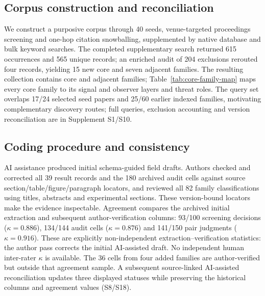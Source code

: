 \subsection{Corpus construction and reconciliation}
We construct a purposive corpus through 40 seeds, venue-targeted proceedings screening and one-hop citation snowballing, supplemented by native database and bulk keyword searches. The completed supplementary search returned 615 occurrences and 565 unique records; an enriched audit of 204 exclusions rerouted four records, yielding 15 new core and seven adjacent families. The resulting collection contains \FinalCore{} core and \FinalAdjacent{} adjacent families; Table~\ref{tab:core-family-map} maps every core family to its signal and observer layers and threat roles. The query set overlaps 17/24 selected seed papers and 25/60 earlier indexed families, motivating complementary discovery routes; full queries, exclusion accounting and version reconciliation are in Supplement S1/S10.

\subsection{Coding procedure and consistency}
AI assistance produced initial schema-guided field drafts. Authors checked and corrected all 39 result records and the 180 archived audit cells against source section/table/figure/paragraph locators, and reviewed all 82 family classifications using titles, abstracts and experimental sections. These version-bound locators make the evidence inspectable. Agreement compares the archived initial extraction and subsequent author-verification columns: 93/100 screening decisions ($\kappa=0.886$), 134/144 audit cells ($\kappa=0.876$) and 141/150 pair judgments ($\kappa=0.916$). These are explicitly non-independent extraction--verification statistics: the author pass corrects the initial AI-assisted draft. No independent human inter-rater $\kappa$ is available. The 36 cells from four added families are author-verified but outside that agreement sample. A subsequent source-linked AI-assisted reconciliation updates three displayed statuses while preserving the historical columns and agreement values (S8/S18).


